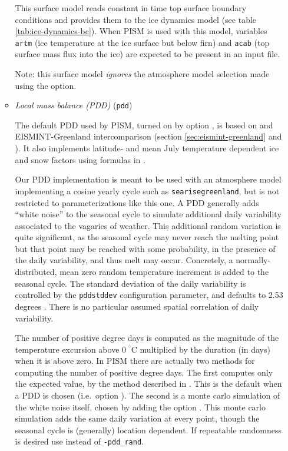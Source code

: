 \begin{enumerate}
\begin{itemize}
    This surface model reads constant in time top surface boundary conditions and provides them to the ice dynamics model (see table \ref{tab:ice-dynamics-bc}). When PISM is used with this model, variables \verb|artm| (ice temperature at the ice surface but below firn) and \verb|acab| (top surface mass flux into the ice) are expected to be present in an input file.

    Note: this surface model \emph{ignores}  the atmosphere model selection made using the  option.

  \item \emph{Local mass balance (PDD)} (\verb|pdd|)    

   The default PDD used by PISM, turned on by option , is based on \cite{CalovGreve05} and EISMINT-Greenland intercomparison (section \ref{sec:eismint-greenland} and \cite{RitzEISMINT}). It also implements latitude- and mean July temperature dependent ice and snow factors using formulas in \cite{Faustoetal2009}.

   Our PDD implementation is meant to be used with an atmosphere model implementing a cosine yearly cycle such as \texttt{searise\und greenland}, but is not restricted to parameterizations like this one. A PDD generally adds ``white noise'' to the seasonal cycle to simulate additional daily variability associated to the vagaries of weather.  This additional random variation is quite significant, as the seasonal cycle may never reach the melting point but that point may be reached with some probability, in the presence of the daily variability, and thus melt may occur.  Concretely, a normally-distributed, mean zero random temperature increment is added to the seasonal cycle.  The standard deviation of the daily variability is controlled by the \texttt{pdd\und std\und dev} configuration parameter, and defaults to 2.53 degrees \cite{Faustoetal2009}. There is no particular assumed spatial correlation of daily variability.

The number of positive degree days is computed as the magnitude of the temperature excursion above $0\!\phantom{|}^\circ \text{C}$ multiplied by the duration (in days) when it is above zero.  In PISM there are actually two methods for computing the number of positive degree days.  The first computes only the expected value, by the method described in \cite{CalovGreve05}.  This is the default when a PDD is chosen (i.e.~option ).  The second is a monte carlo simulation of the white noise itself, chosen by adding the option .  This monte carlo simulation adds the same daily variation at every point, though the seasonal cycle is (generally) location dependent.  If repeatable randomness is desired use  instead of \verb|-pdd_rand|.


\end{itemize}
\end{enumerate}

